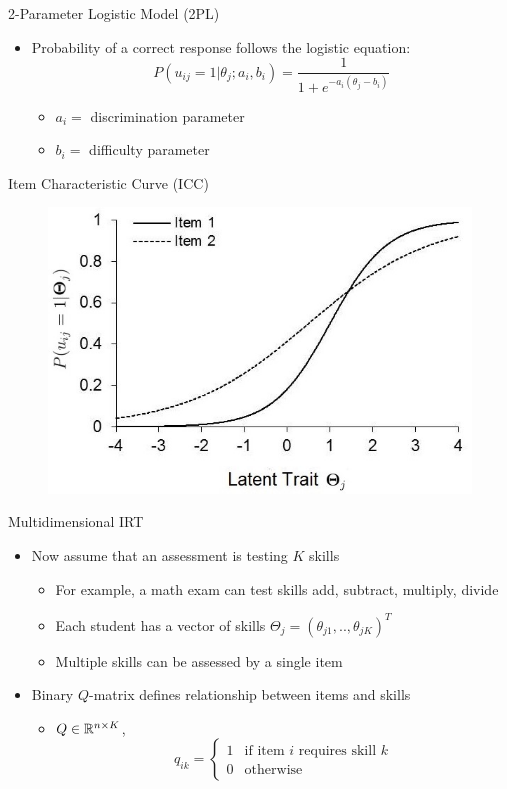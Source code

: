 \documentclass{beamer}
\def \R{\ensuremath \mathbb{R}}
\theoremstyle{definition}
\begin{document}
\begin{frame}{2-Parameter Logistic Model (2PL)}
\begin{itemize}
  \item Probability of a correct response follows the logistic equation:
    \[P(u_{ij} = 1 | \theta_j; a_i, b_i) = \frac{1}{1 + e^{-a_i(\theta_j - b_i)}}\]
  \begin{itemize}
    \item<2-> $a_i =$ discrimination parameter
    \item<2-> $b_i =$ difficulty parameter
  \end{itemize}
\end{itemize}
\end{frame}

\begin{frame}{Item Characteristic Curve (ICC)}
\begin{figure}
  \includegraphics[width=.7\textwidth]{../img/logistic_2param_icc.jpg}
\end{figure}

\end{frame}
\begin{frame}{Multidimensional IRT}
\begin{itemize}
  \item Now assume that an assessment is testing $K$ skills
  \begin{itemize}
    \item For example, a math exam can test skills add, subtract, multiply, divide
    \item Each student has a vector of skills $\Theta_j = (\theta_{j1},.., \theta_{jK})^T$
    \item Multiple skills can be assessed by a single item
  \end{itemize}
  \item<2-> Binary $Q$-matrix defines relationship between items and skills
  \begin{itemize}
    \item<2-> $Q \in \R^{n \times K}$, \[q_{ik} = \begin{cases}
    1 & \text{if item } i \text{ requires skill } k \\ 
    0 & \text{otherwise} 
    \end{cases}\]
  \end{itemize}
\end{itemize}
\end{frame}
\end{document}

